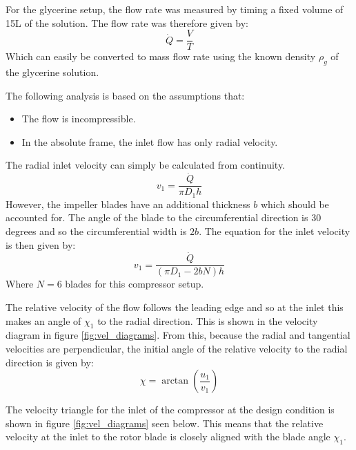 \documentclass{article}
\begin{document}
For the glycerine setup, the flow rate was measured by timing a fixed volume of 15L of the solution.
The flow rate was therefore given by:
\begin{equation}
    \dot{Q} = \frac{V}{T}
\end{equation}
Which can easily be converted to mass flow rate using the known density $\rho_g$ of the glycerine solution.


The following analysis is based on the assumptions that:
\begin{itemize}
    \item The flow is incompressible.
    \item In the absolute frame, the inlet flow has only radial velocity.
\end{itemize} 

The radial inlet velocity can simply be calculated from continuity.
\begin{equation}
    v_1 = \frac{\dot{Q}}{\pi D_1 h} \label{eq:simple_radial_velocity}
\end{equation}
However, the impeller blades have an additional thickness $b$ which should be accounted for.
The angle of the blade to the circumferential direction is 30 degrees and so the circumferential width is $2b$.
The equation for the inlet velocity is then given by:
\begin{equation}
    v_1 = \frac{\dot{Q}}{(\pi D_1 - 2b N) h} \label{eq:radial_velocity}
\end{equation}
Where $N = 6$ blades for this compressor setup.

The relative velocity of the flow follows the leading edge and so at the inlet this makes an angle of $\chi_1$ to the radial direction.
This is shown in the velocity diagram in figure \ref{fig:vel_diagrams}.
From this, because the radial and tangential velocities are perpendicular,
the initial angle of the relative velocity to the radial direction is given by:
\begin{equation}
    \chi = \arctan\left( \frac{u_1}{v_1} \right)
\end{equation}

The velocity triangle for the inlet of the compressor at the design condition is shown in figure \ref{fig:vel_diagrams} seen below.
This means that the relative velocity at the inlet to the rotor blade is closely aligned with the blade angle $\chi_1$.
\end{document}
